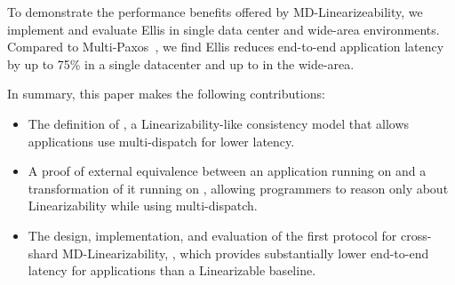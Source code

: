 To demonstrate the performance benefits offered by MD-Linearizeability,
we implement and evaluate Ellis in single data center and wide-area environments.
Compared to Multi-Paxos~\cite{lamport1998paxos}, we find Ellis
reduces end-to-end application latency by up to 75\% in a single datacenter and up to  in the wide-area.

In summary, this paper makes the following contributions:

\begin{itemize}[leftmargin=*]
\item The definition of \mdl{}, a Linearizability-like consistency model that allows applications use multi-dispatch for lower latency.
\item A proof of external equivalence between an application running on \sdl{} and a transformation of it running on \mdl{}, allowing programmers to reason only about Linearizability while using multi-dispatch.
\item The design, implementation, and evaluation of the first protocol for cross-shard MD-Linearizability, \sys{}, which provides substantially lower end-to-end latency for applications than a Linearizable baseline.
\end{itemize}





